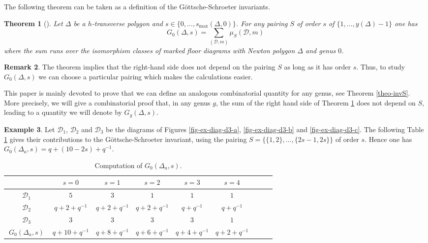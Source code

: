 \documentclass[11pt]{article}
\newtheorem{theo}{Theorem}[section]
\theoremstyle{definition}
\newtheorem{exam}[theo]{Example}
\newtheorem{rema}[theo]{Remark}
\numberwithin{equation}{section}
\newcommand{\D}{\mathcal{D}}
\newcommand{\dsum}{\displaystyle\sum}
\newcommand{\smax}{s_{\max}}
\theoremstyle{plain}
\begin{document}
The following theorem can be taken as a definition of the Göttsche-Schroeter invariants.

\begin{theo}[{\cite[Theorem 2.13]{brugalle_polynomiality_2022}}]\label{theo-GS-inv-formula}
Let $\Delta$ be a $h$-transverse polygon and $s\in \{0,\dots,\smax(\Delta,0)\}$. For any pairing $S$ of order $s$ of $\{1,\dots, y(\Delta)-1 \}$ one has
\[ G_0(\Delta,s) = \dsum_{(\D,m)} \mu_S(\D,m)  \]
where the sum runs over the isomorphism classes of marked floor diagrams with Newton polygon $\Delta$ and genus $0$.
\end{theo}

\begin{rema}
The theorem implies that the right-hand side does not depend on the pairing $S$ as long as it has order $s$. Thus, to study $G_0(\Delta,s)$ we can choose a particular pairing which makes the calculations easier.

This paper is mainly devoted to prove that we can define an analogous combinatorial quantity for any genus, see Theorem \ref{theo-invS}. More precisely, we will give a combinatorial proof that, in any genus $g$, the sum of the right hand side of Theorem \ref{theo-GS-inv-formula} does not depend on $S$, leading to a quantity we will denote by $G_g(\Delta,s)$.
\end{rema}


\begin{exam} \label{ex-calcul-G0-Delta3}
    Let $\D_1$, $\D_2$ and $\D_3$ be the diagrams of Figures \ref{fig-ex-diag-d3-a}, \ref{fig-ex-diag-d3-b} and \ref{fig-ex-diag-d3-c}. The following Table \ref{table-ex-refined-inv} gives their contributions to the Göttsche-Schroeter invariant, using the pairing $S = \{\{1,2\},\dots,\{2s-1,2s\}\}$ of order $s$. Hence one has $G_0(\Delta_a,s) = q+(10-2s)+q^{-1}$.

\begin{table}[ht]
\renewcommand{\arraystretch}{1.5}
\centering
\begin{tabular}{|c||c|c|c|c|c|c|c|c|}
\hline 
 & $s=0$ & $s=1$ & $s=2$ & $s=3$ & $s=4$ \\
 \hline
 \hline
$\ \D_1\ $ & $5$ & $3$ & $1$ & $1$ & $1$ \\
\hline 
$\ \D_2\ $ & $q+2+q^{-1}$ & $q+2+q^{-1}$ & $q+2+q^{-1}$ & $q+q^{-1}$ & $q+q^{-1}$  \\
\hline
$\ \D_3\ $ & $3$ & $3$ & $3$ & $3$ & $1$ \\
\hline 
 \hline
$\ G_0(\Delta_a,s) \ $ & $q+10+q^{-1}$ & $q+8+q^{-1}$ & $q+6+q^{-1}$ & $q+4+q^{-1}$ & $q+2+q^{-1}$ \\
\hline 
\end{tabular}
\caption{Computation of $G_0(\Delta_a,s)$.}
\label{table-ex-refined-inv}
\end{table}
\end{exam}
\end{document}
